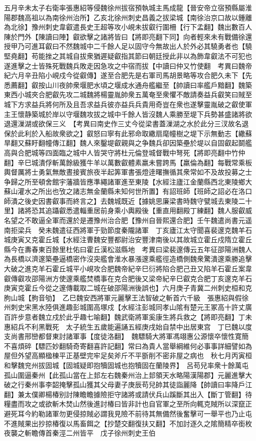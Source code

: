 五月辛未太子右衛率張惠紹等侵魏徐州拔宿預執城主馬成龍【晉安帝立宿預縣屬淮陽郡魏高祖以為南徐州治所】乙亥北徐州刺史昌義之拔梁城【南徐治京口故以鍾離為北徐】豫州刺史韋叡遣長史王超等攻小峴未拔叡行圍柵【行下孟翻】魏出數百人陳於門外【陳讀曰陣】叡欲擊之諸將皆曰【將即亮翻下同】向者輕來未有戰備徐還授甲乃可進耳叡曰不然魏城中二千餘人足以固守今無故出人於外必其驍勇者也【驍堅堯翻】苟能挫之其城自拔衆猶遲疑叡指其節曰朝廷授此非以為飾韋叡法不可犯也遂進擊之士皆殊死戰魏兵敗走因急攻之中宿而拔【中讀曰仲又竹使翻　考異曰魏帝紀六月辛丑陷小峴戍今從叡傳】遂至合肥先是右軍司馬胡景略等攻合肥久未下【先悉薦翻】叡按山川夜帥衆堰肥水頃之堰成水通舟艦繼至【帥讀曰率艦戶黯翻】魏築東西小城夾合肥叡先攻二城魏將楊靈胤帥衆五萬奄至衆懼不敵請奏益兵叡笑曰賊至城下方求益兵將何所及且吾求益兵彼亦益兵兵貴用奇豈在衆也遂擊靈胤破之叡使軍主王懷静築城於岸以守堰魏攻拔之城中千餘人皆沒魏人乘勝至堤下兵勢甚盛諸將欲退還漅湖或欲保三义　【考異曰南史作三丈今從梁書蓋漅湖之水於此分三汊故名退保於此利於入船故衆欲之】叡怒曰寧有此邪命取繖扇麾幢樹之堤下示無動志【繖蘇旱翻又蘇盱翻幢傳江翻】魏人來鑿堤叡親與之争魏兵卻因築壘於堤以自固叡起鬬艦高與合肥城等四面臨之城中人皆哭守將杜元倫登城督戰中弩死【將即亮翻中竹仲翻】辛巳城潰俘斬萬餘級獲牛羊以萬數叡體素羸未嘗跨馬【羸倫為翻】每戰常乘板輿督厲將士勇氣無敵晝接賓旅夜半起筭軍書張燈逹曙撫循其衆常如不及故投募之士争歸之所至頓舍館宇藩牆皆應準繩諸軍進至東陵【水經注廬江金蘭縣西北東陵鄉大蘇山灌水之所出也攷之諸志無金蘭縣未知何世所置】有詔班師【班師之詔必在洛口師潰之後史因書叡事而終言之】去魏城既近【據姚思廉梁書時魏守甓城去東陵二十里】諸將恐其追躡叡悉遣輜重居前身乘小輿殿後【重直用翻殿丁練翻】魏人服叡威名望之不敢逼全軍而還於是遷豫州治合肥【豫州自晉熙還合肥】壬午魏遣尚書元遥南拒梁兵　癸未魏遣征西將軍于勁節度秦隴諸軍　丁亥廬江太守聞喜裴邃克魏羊石城庚寅又克霍丘城【水經注曹魏安豐都尉治安豐津南後以其故城立霍丘戍隋立霍丘縣今在夀春東百餘里杜佑曰霍丘漢松滋縣地　考異曰梁裴邃傳云五年征邵陽洲魏人為長橋以濟邃築壘逼橋密作沒突艦會淮水暴漲邃乘艦徑造橋側魏衆驚潰邃乘勝追擊大破之進克羊石霍丘城平小峴攻合肥魏帝紀辛巳衍將陷合肥己丑又陷羊石霍丘案韋叡傳叡攻邵陽洲方使邃乘艦焚橋事在克合肥後又梁帝紀辛巳叡克合肥丁亥邃克羊石庚寅克霍丘今從之邃傳載取二城在破邵陽洲後誤也】六月庚子青冀二州刺史桓和克朐山城【胊音劬】　乙巳魏安西將軍元麗擊王法智破之斬首六千級　張惠紹與假徐州刺史宋黑水陸俱進趣彭城圍高塚戍【水經注彭城同孝山隂有楚元王冢高十許丈廣百許步意者魏立戍於此乎趣七喻翻】魏武衛將軍奚康生將兵救之【將即亮翻】丁未惠紹兵不利黑戰死　太子統生五歲能遍誦五經庚戌始自禁中出居東宫　丁巳魏以度支尚書邢巒都督東討諸軍事【度徒洛翻】　魏驃騎大將軍馮翊惠公源懷卒懷性寛簡不喜煩碎【驃匹妙翻騎奇寄翻喜許記翻】常曰為貴人當舉綱維何必事事詳細譬如為屋但外望高顯楹棟平正基壁完牢足矣斧斤不平斵削不密非屋之病也　秋七月丙寅桓和擊魏兖州拔固城【固城疑即抱犢固城也抱犢固在蘭陵界】　呂苟兒率衆十餘萬屯孤山圍逼秦州【此孤山當在上邽左右魏秦州治上邽領天水略陽漢陽郡】元麗進擊大破之行秦州事李韶掩擊孤山獲其父母妻子庚辰苟兒帥其徒詣麗降【帥讀曰率降戶江翻】兼太僕卿楊椿别討陳瞻瞻據險拒守諸將或請伏兵山蹊斷其出入【斷丁管翻】待糧盡而攻之或欲斬木焚山然後進討椿曰皆非計也自官軍之至所向輒克賊所以深竄正避死耳今約勒諸軍勿更侵掠賊必謂我見險不前待其無備然後奮擊可一舉平也乃止屯不進賊果出抄掠椿復以馬畜餌之【抄楚交翻復扶又翻】不加討逐久之隂簡精卒銜枚夜襲之斬瞻傳首秦涇二州皆平　戊子徐州刺史王伯